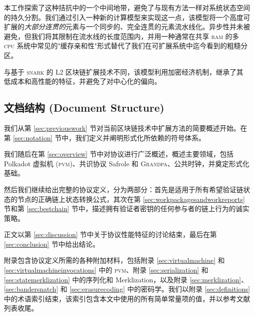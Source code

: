 本工作探索了这种拮抗中的一个中间地带，避免了与现有方法一样对系统状态空间的持久分割。我们通过引入一种新的计算模型来实现这一点，该模型将一个高度可扩展的\emph{大部分连贯的}元素与一个同步的、完全连贯的元素流水线化。异步性并未被避免，但我们将其限制在流水线的长度范围内，并用一种通常在共享 \textsc{ram} 的多 \textsc{cpu} 系统中常见的"缓存亲和性"形式替代了我们在可扩展系统中迄今看到的粗糙分区。

与基于 \textsc{snark} 的 L2 区块链扩展技术不同，该模型利用加密经济机制，继承了其低成本和高性能的特征，并避免了对中心化的偏向。

\subsection{文档结构 (Document Structure)}

我们从第 \ref{sec:previouswork} 节对当前区块链技术中扩展方法的简要概述开始。在第 \ref{sec:notation} 节中，我们定义并阐明形式化所依赖的符号体系。

我们随后在第 \ref{sec:overview} 节中对协议进行广泛概述，概述主要领域，包括 Polkadot 虚拟机 (\textsc{pvm})、共识协议 Safrole 和 \textsc{Grandpa}、公共时钟，并奠定形式化基础。

然后我们继续给出完整的协议定义，分为两部分：首先是适用于所有希望验证链状态的节点的正确链上状态转换公式，其次在第 \ref{sec:workpackagesandworkreports} 节和第 \ref{sec:bestchain} 节中，描述拥有验证者密钥的任何参与者的链上行为的诚实策略。

正文以第 \ref{sec:discussion} 节中关于协议性能特征的讨论结束，最后在第 \ref{sec:conclusion} 节中给出结论。

附录包含协议定义所需的各种附加材料，包括附录 \ref{sec:virtualmachine} 和 \ref{sec:virtualmachineinvocations} 中的 \textsc{pvm}、附录 \ref{sec:serialization} 和 \ref{sec:statemerklization} 中的序列化和 Merklization，以及附录 \ref{sec:merklization}、\ref{sec:bandersnatch} 和 \ref{sec:erasurecoding} 中的密码学。我们以附录 \ref{sec:definitions} 中的术语索引结束，该索引包含本文中使用的所有简单常量项的值，并以参考文献列表收尾。
